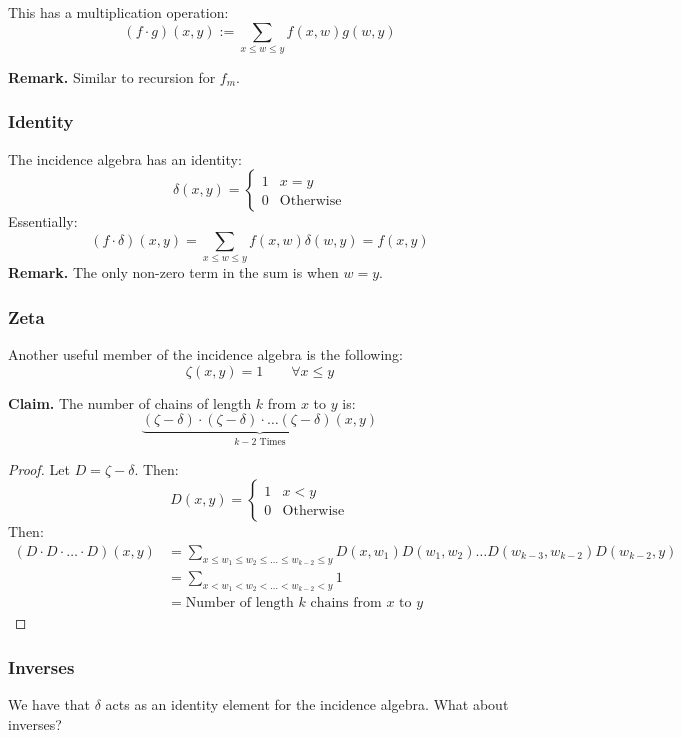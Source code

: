 \documentclass[letterpaper]{article}
\begin{document}
\bigskip 

This has a multiplication operation:
\[(f \cdot g)(x, y) := \sum_{x \leq w \leq y} f(x, w)g(w, y)\]

\textbf{Remark.} Similar to recursion for $f_m$. 

\subsubsection{Identity}
The incidence algebra has an identity:
\[\delta(x, y) = \begin{cases}
    1 & x = y \\ 
    0 & \text{Otherwise}
\end{cases}\]
Essentially:
\[(f \cdot \delta)(x, y) = \sum_{x \leq w \leq y} f(x, w)\delta(w, y) = f(x, y)\]
\textbf{Remark.} The only non-zero term in the sum is when $w = y$. 

\subsubsection{Zeta}
Another useful member of the incidence algebra is the following:
\[\zeta(x, y) = 1 \qquad \forall x \leq y\]

\textbf{Claim.} The number of chains of length $k$ from $x$ to $y$ is:
\[\underbrace{(\zeta - \delta) \cdot (\zeta - \delta) \cdot \dots (\zeta - \delta)(x, y)}_{k - 2 \text{ Times}}\]

\begin{proof}
    Let $D = \zeta - \delta$. Then:
    \[D(x, y) = \begin{cases}
        1 & x < y \\
        0 & \text{Otherwise}
    \end{cases}\]
    Then:
    \begin{equation*}
        \begin{aligned}
            (D \cdot D \cdot \dots \cdot D)(x, y) &= \sum_{x \leq w_1 \leq w_2 \leq \dots \leq w_{k - 2} \leq y} D(x, w_1)D(w_1, w_2) \dots D(w_{k - 3}, w_{k - 2})D(w_{k - 2}, y) \\ 
                &= \sum_{x < w_1 < w_2 < \dots < w_{k - 2} < y} 1 \\ 
                &= \text{Number of length } k \text{ chains from } x \text{ to } y
        \end{aligned}
    \end{equation*}
\end{proof}

\subsubsection{Inverses}
We have that $\delta$ acts as an identity element for the incidence algebra. What about inverses? 
\end{document}
